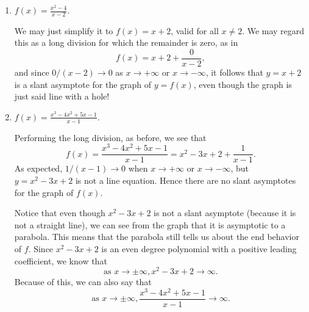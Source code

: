 \documentclass{ximera}
\begin{document}
\begin{example}
\begin{enumerate}
  \item $f(x) = \frac{x^2-4}{x-2}$. \\[1em]
    \begin{explanation}
      We may just simplify it to $f(x) = x+2$, valid for all $x \neq 2$. We may regard this as a long division for which the remainder is zero, as in $$  f(x) = x+2+\frac{0}{x-2},  $$and since $0/(x-2) \to 0$ as $x\to +\infty$ or $x\to -\infty$, it follows that $y=x+2$ is a slant asymptote for the graph of $y=f(x)$, even though the graph is just said line with a hole!
      \begin{image}
      \end{image}      
    \end{explanation}
  \item $f(x)=\frac{x^3-4x^2+5x-1}{x-1}$. \\[1em]
    \begin{explanation}
      Performing the long division, as before, we see that $$   f(x) = \frac{x^3-4x^2+5x-1}{x-1} = x^2-3x+2 + \frac{1}{x-1}.  $$As expected, $1/(x-1) \to 0$ when $x \to +\infty$ or $x\to -\infty$, but $y=x^2-3x+2$ is not a line equation. Hence there are no slant asymptotes for the graph of $f(x)$.
      \begin{image}
      \end{image}
    \end{explanation}
Notice that even though $x^2-3x+2$ is not a slant asymptote (because it is not a straight line), we can see from the graph that it is asymptotic to a parabola.  This means that the parabola still tells us about the end behavior of $f$.  Since $x^2-3x+2$ is an even degree polynomial with a positive leading coefficient, we know that 
\[
\text{as } x \rightarrow \pm \infty, x^2-3x+2 \rightarrow \infty.
\]
 Because of this, we can also say that 
\[
\text{as } x \rightarrow \pm \infty, \frac{x^3-4x^2+5x-1}{x-1} \rightarrow \infty.
\]


\end{enumerate}
\end{example}
\end{document}
